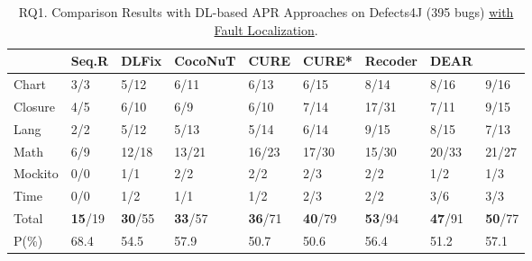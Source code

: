 \begin{table}[t]
  \caption{RQ1. Comparison Results with DL-based APR Approaches on Defects4J (395 bugs) \underline {with Fault Localization}.}
  \vspace{-6pt}
         {\footnotesize
        \tabcolsep 2.5pt
			\begin{center}
				\renewcommand{\arraystretch}{1}
				\begin{tabular}{p{0.7cm}<{\centering}|p{0.7cm}<{\centering}|p{0.7cm}<{\centering}|p{1cm}<{\centering}|p{0.8cm}<{\centering}|p{0.8cm}<{\centering}|p{0.9cm}<{\centering}|p{0.8cm}<{\centering}|p{0.8cm}<{\centering}}
					
					\hline
					&\textbf{Seq.R}&\textbf{DLFix}& \textbf{CocoNuT}&\textbf{CURE}&\textbf{CURE*}& {\bf Recoder} & {\bf DEAR} &\textbf{\tool}\\
					\hline
					Chart  & 3/3   & 5/12  & 6/11  & 6/13  & 6/15 & 8/14 & 8/16 & 9/16\\
					Closure& 4/5   & 6/10  & 6/9   & 6/10  & 7/14 & 17/31 & 7/11 & 9/15\\
					Lang   & 2/2   & 5/12  & 5/13  & 5/14  & 6/14  & 9/15 & 8/15 & 7/13\\
					Math    & 6/9  & 12/18 & 13/21 & 16/23 & 17/30 & 15/30 & 20/33 & 21/27\\
					Mockito & 0/0   & 1/1   & 2/2   & 2/2  & 2/3  & 2/2 & 1/2 & 1/3\\
					Time    & 0/0   & 1/2   & 1/1   & 1/2  & 2/3 & 2/2 & 3/6 & 3/3\\
					\hline
					Total   & {\bf 15}/19 & {\bf 30}/55 & {\bf 33}/57 & {\bf 36}/71 & {\bf 40}/79 & {\bf 53}/94 & {\bf 47}/91 & {\bf 50}/77\\
					\hline
					P(\%)  & 68.4  & 54.5  & 57.9  & 50.7  & 50.6 & 56.4 & 51.2 & 57.1\\
					\hline
				\end{tabular}
				\label{RQ1_defects4J_with_FL}
			\end{center}
                }
		\end{table}


